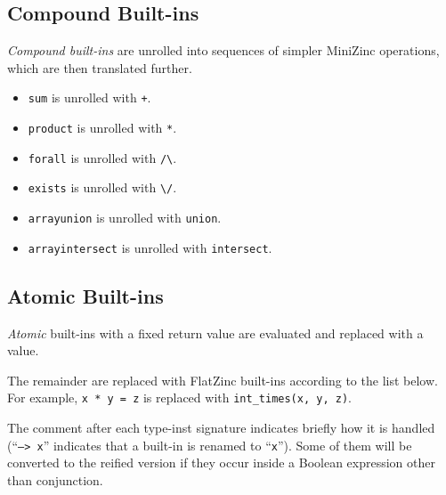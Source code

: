 \documentclass[10pt]{article}
\newcommand{\n}{\symbol{95}}
\begin{document}
\subsection{Compound Built-ins}
     \label{Compound Built-ins}
\emph{Compound built-ins} are unrolled into sequences of
simpler MiniZinc operations, which are then translated further.

\begin{itemize}
\item \texttt{sum}                is unrolled with \texttt{+}.
\item \texttt{product}            is unrolled with \texttt{*}.
\item \texttt{forall}             is unrolled with \verb+/\+.
\item \texttt{exists}             is unrolled with \verb+\/+.
\item \texttt{array\n{}union}     is unrolled with \texttt{union}.
\item \texttt{array\n{}intersect} is unrolled with \texttt{intersect}.
\end{itemize}

\subsection{Atomic Built-ins}
\emph{Atomic} built-ins with a fixed return value are evaluated and
replaced with a value.  

The remainder are replaced with FlatZinc built-ins according to the list
below.  For example, \verb+x * y = z+ is replaced with
\verb+int_times(x, y, z)+.

The comment after each type-inst signature
indicates briefly how it is handled (``\texttt{--> x}'' indicates that a
built-in is renamed to ``\texttt{x}'').  Some of them will be converted to
the reified version if they occur inside a Boolean expression other than
conjunction.
\end{document}

